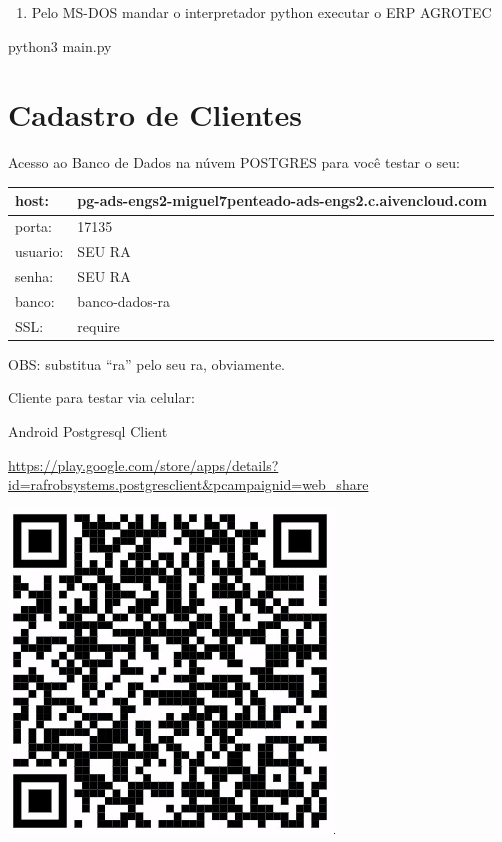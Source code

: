 \documentclass[
]{book}
\newenvironment{Shaded}{\begin{snugshade}}{\end{snugshade}}
\newcommand{\NormalTok}[1]{#1}
\providecommand{\tightlist}{%
  \setlength{\itemsep}{0pt}\setlength{\parskip}{0pt}}
\begin{document}
\begin{enumerate}
\def\labelenumi{\arabic{enumi}.}
\setcounter{enumi}{4}
\tightlist
\item
  Pelo MS-DOS mandar o interpretador python executar o ERP AGROTEC
\end{enumerate}

\begin{Shaded}
\begin{Highlighting}[]
\NormalTok{python3 main.py}
\end{Highlighting}
\end{Shaded}

\section{Cadastro de Clientes}\label{cadastro-de-clientes-1}

Acesso ao Banco de Dados na núvem POSTGRES para você testar o seu:

\begin{longtable}[]{@{}ll@{}}
\toprule\noalign{}
host: & pg-ads-engs2-miguel7penteado-ads-engs2.c.aivencloud.com \\
\midrule\noalign{}
\endhead
\bottomrule\noalign{}
\endlastfoot
porta: & 17135 \\
usuario: & SEU RA \\
senha: & SEU RA \\
banco: & banco-dados-ra \\
SSL: & require \\
\end{longtable}

OBS: substitua ``ra'' pelo seu ra, obviamente.

Cliente para testar via celular:

Android Postgresql Client

\url{https://play.google.com/store/apps/details?id=rafrobsystems.postgresclient&pcampaignid=web_share}

\includegraphics{images/clipboard-78059825.png}
\end{document}
